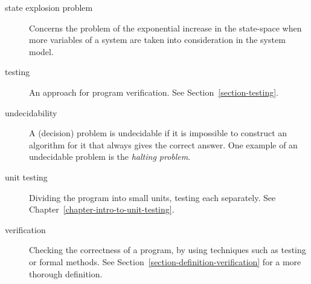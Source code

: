 \documentclass[a4paper,11pt]{kth-mag}
\begin{document}
\begin{description}
  \item[state explosion problem] Concerns the problem of the exponential
    increase in the state-space when more variables of a system are taken into
    consideration in the system model.

  \item[testing] An approach for program verification. See
    Section~\ref{section-testing}.

  \item[undecidability] A (decision) problem is undecidable if it is impossible
    to construct an algorithm for it that always gives the correct answer. One
    example of an undecidable problem is the \textit{halting problem}.

  \item[unit testing] Dividing the program into small units, testing each
    separately. See Chapter~\ref{chapter-intro-to-unit-testing}.

  \item[verification] Checking the correctness of a program, by using
    techniques such as testing or formal methods. See
    Section~\ref{section-definition-verification} for a more thorough
    definition.
\end{description}
\end{document}
